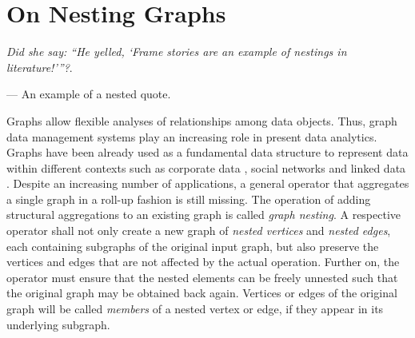 \chapter{On Nesting Graphs}\label{cha:nesting}

\epigraph{\textit{Did she say: ``He yelled, \lq Frame stories are an example of nestings in literature!\rq\;''?}.}{--- An example of a nested quote.}

Graphs allow flexible analyses of relationships among data objects. Thus, graph data management systems play an increasing role in present data analytics. Graphs have been already used as a fundamental data structure to represent data within different contexts such as corporate data \cite{success,Park2016355}, social networks \cite{xie,BrodkaK14} and linked data \cite{Vasilyeva13}.
Despite an increasing number of applications, a general operator that aggregates a single graph in a roll-up fashion is still missing. 
The operation of adding structural aggregations to an existing graph is called \textit{graph nesting}.
A respective operator shall not only create a new graph of \textit{nested vertices} and \textit{nested edges}, each containing subgraphs of the original input graph, but also preserve the vertices and edges that are not affected by the actual operation. Further on, the operator must ensure that the nested elements can be freely unnested such that the original graph may be obtained back again. Vertices or edges of the original graph will be called \textit{members} of a nested vertex or edge, if they appear in its underlying subgraph.

